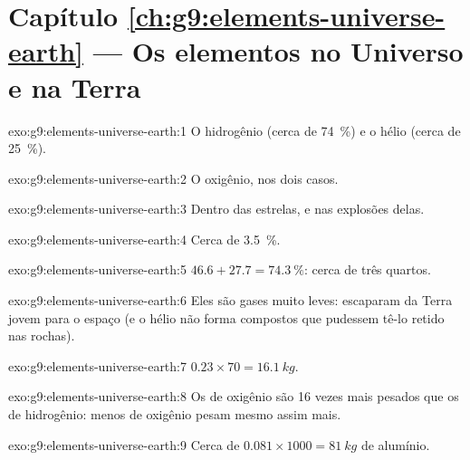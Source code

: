 \section*{Capítulo \ref{ch:g9:elements-universe-earth} --- Os elementos no Universo e na Terra}

\begin{solution}{exo:g9:elements-universe-earth:1}
O hidrogênio (cerca de \qty{74}{\percent}) e o hélio (cerca de
\qty{25}{\percent}).
\end{solution}

\begin{solution}{exo:g9:elements-universe-earth:2}
O oxigênio, nos dois casos.
\end{solution}

\begin{solution}{exo:g9:elements-universe-earth:3}
Dentro das estrelas, e nas explosões delas.
\end{solution}

\begin{solution}{exo:g9:elements-universe-earth:4}
Cerca de \qty{3.5}{\percent}.
\end{solution}

\begin{solution}{exo:g9:elements-universe-earth:5}
$46.6 + 27.7 = \qty{74.3}{\percent}$: cerca de três quartos.
\end{solution}

\begin{solution}{exo:g9:elements-universe-earth:6}
Eles são gases muito leves: escaparam da Terra jovem para o espaço (e o
hélio não forma compostos que pudessem tê-lo retido nas rochas).
\end{solution}

\begin{solution}{exo:g9:elements-universe-earth:7}
$0.23 \times 70 = \qty{16.1}{kg}$.
\end{solution}

\begin{solution}{exo:g9:elements-universe-earth:8}
Os  de oxigênio são 16 vezes mais pesados que os de hidrogênio:
menos  de oxigênio pesam mesmo assim mais.
\end{solution}

\begin{solution}{exo:g9:elements-universe-earth:9}
Cerca de $0.081 \times 1000 = \qty{81}{kg}$ de alumínio.
\end{solution}

